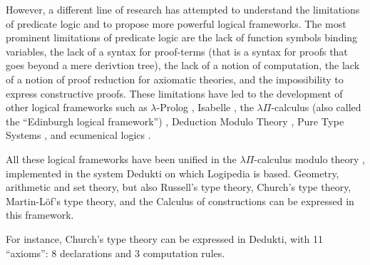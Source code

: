 

However, a different line of research has attempted to understand the
limitations of predicate logic and to propose more powerful logical
frameworks.  The most prominent limitations of predicate logic are the
lack of function symbols binding variables, the lack of a syntax for
proof-terms (that is a syntax for proofs that goes beyond a mere
derivtion tree), the lack of a notion of computation, the lack of a
notion of proof reduction for axiomatic theories, and the
impossibility to express constructive proofs. These limitations have
led to the development of other logical frameworks such as
$\lambda$-Prolog \cite{MillerNadathur12}, Isabelle \cite{Paulson90},
the $\lambda \Pi$-calculus (also called the ``Edinburgh logical
framework'') \cite{HarperHonsellPlotkin91}, Deduction Modulo Theory
\cite{DowekHardinKirchner03, DowekWerner03}, Pure Type Systems
\cite{Berardi88,Terlouw89}, and ecumenical logics
\cite{Prawitz15,Dowek15,PereiraRodriguez17}.

All these logical frameworks have been unified in the $\lambda
\Pi$-calculus modulo theory \cite{CousineauDowek07}, implemented in
the system Dedukti \cite{Assaf16} on which Logipedia is
based. Geometry, arithmetic and set theory, but also Russell's type
theory, Church's type theory, Martin-L\"of's type theory, and the
Calculus of constructions can be expressed in this framework.

For instance, Church's type
theory can be expressed in Dedukti, with 11 ``axioms'': 8 declarations
and 3 computation rules.

